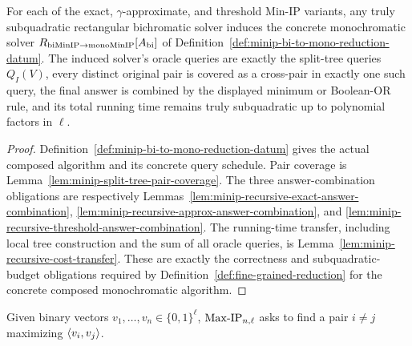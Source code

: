 \begin{lemma}
  \label{lem:minip-bi-to-mono}
  For each of the exact, $\gamma$-approximate, and threshold Min-IP variants,
  any truly subquadratic rectangular bichromatic solver induces the concrete
  monochromatic solver
  $R_{\rm biMinIP\to monoMinIP}[A_{\rm bi}]$ of
  Definition~\ref{def:minip-bi-to-mono-reduction-datum}.  The induced solver's
  oracle queries are exactly the split-tree queries $Q_I(V)$, every distinct
  original pair is covered as a cross-pair in exactly one such query, the final
  answer is combined by the displayed minimum or Boolean-OR rule, and its total
  running time remains truly subquadratic up to polynomial factors in $\ell$.
\end{lemma}
\begin{proof}
  Definition~\ref{def:minip-bi-to-mono-reduction-datum} gives the actual
  composed algorithm and its concrete query schedule.  Pair coverage is
  Lemma~\ref{lem:minip-split-tree-pair-coverage}.  The three answer-combination
  obligations are respectively
  Lemmas~\ref{lem:minip-recursive-exact-answer-combination},
  \ref{lem:minip-recursive-approx-answer-combination}, and
  \ref{lem:minip-recursive-threshold-answer-combination}.  The running-time
  transfer, including local tree construction and the sum of all oracle
  queries, is Lemma~\ref{lem:minip-recursive-cost-transfer}.  These are exactly
  the correctness and subquadratic-budget obligations required by
  Definition~\ref{def:fine-grained-reduction} for the concrete composed
  monochromatic algorithm.
\end{proof}

\begin{definition}
  \label{def:max-ip}
  Given binary vectors $v_1,\ldots,v_n\in\{0,1\}^{\ell}$,
  $\mathrm{Max\mbox{-}IP}_{n,\ell}$ asks to find a pair $i\neq j$ maximizing $\left\langle v_i,v_j\right\rangle$.
\end{definition}

